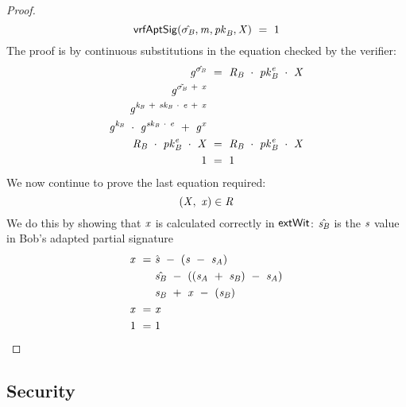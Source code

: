 \begin{proof}
    \[
        \mathsf{vrfAptSig}(\hat{\sigma_{\mathit{B}}},\mathit{m},\mathit{pk}_{\mathit{B}},\mathit{X}) ~=~ 1
    \]
    The proof is by continuous substitutions in the equation checked by the verifier:
    \begin{align}
        \mathit{g}^{\hat{\sigma_{\mathit{B}}}} &~=~ \mathit{R}_{\mathit{B}} ~\cdot~ \mathit{pk}_{\mathit{B}}^{\mathit{e}} ~\cdot~ \mathit{X} \\
        \mathit{g}^{\tilde{\sigma_{\mathit{B}}} ~+~ \mathit{x}} & \\
        \mathit{g}^{\mathit{\mathit{k}_{\mathit{B}}} ~+~ \mathit{sk}_{\mathit{B}} ~\cdot~ \mathit{e} ~+~ \mathit{x}} & \\
        \mathit{g}^{\mathit{\mathit{k}_{\mathit{B}}}} ~\cdot~ \mathit{g}^{\mathit{sk}_{\mathit{B}} ~\cdot~ \mathit{e}} ~+~ \mathit{g}^{\mathit{x}} & \\
        \mathit{R}_{\mathit{B}} ~\cdot~ \mathit{pk}_{\mathit{B}}^{\mathit{e}} ~\cdot~ \mathit{X} &~=~ \mathit{R}_{\mathit{B}} ~\cdot~ \mathit{pk}_{\mathit{B}}^{\mathit{e}} ~\cdot~ \mathit{X} \\
        1 &~=~ 1
    \end{align}
    We now continue to prove the last equation required:
    \[
        (\mathit{X} ,~ \mathit{x}) \in \mathit{R}
    \]
    We do this by showing that $\mathit{x}$ is calculated correctly in $\mathsf{extWit}$:
    $\hat{\mathit{s}_{\mathit{B}}}$ is the $\mathit{s}$ value in Bob's adapted partial signature
    \begin{align}
        \mathit{x} ~=~ & \hat{\mathit{s}} ~-~ (\mathit{s} ~-~ \mathit{s}_{\mathit{A}}) \\
        & \hat{\mathit{s}_{\mathit{B}}} ~-~ ((\mathit{s}_{\mathit{A}} ~+~ \mathit{s}_{\mathit{B}} ) ~-~ \mathit{s}_{\mathit{A}} ) \\
        & \mathit{s}_{\mathit{B}} ~+~ \mathit{x} ~-~ (\mathit{s}_{\mathit{B}}) \\
        \mathit{x} ~=~ & \mathit{x} \\
        1 ~=~ & 1
    \end{align}
\end{proof}

\subsection{Security}\label{subsec:sig:secureaptscheme}

